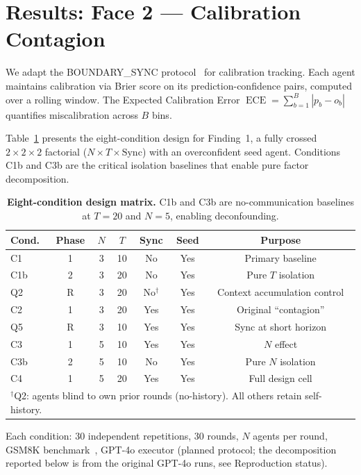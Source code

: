 \documentclass[11pt]{article}
\DeclareMathOperator{\ECE}{ECE}
\begin{document}
\section{Results: Face 2 --- Calibration Contagion}

We adapt the BOUNDARY\_SYNC protocol~\citep{boundarysync2026} for calibration tracking. Each agent maintains calibration via Brier score on its prediction-confidence pairs, computed over a rolling window. The Expected Calibration Error $\ECE = \sum_{b=1}^{B} |p_b - o_b|$ quantifies miscalibration across $B$ bins.

Table~\ref{tab:design} presents the eight-condition design for Finding~1, a fully crossed $2 \times 2 \times 2$ factorial ($N \times T \times \text{Sync}$) with an overconfident seed agent. Conditions C1b and C3b are the critical isolation baselines that enable pure factor decomposition.

\begin{table}[H]
\centering
\caption{\textbf{Eight-condition design matrix.} C1b and C3b are no-communication baselines at $T{=}20$ and $N{=}5$, enabling deconfounding.}
\label{tab:design}
\begin{tabular}{@{}lcccccc@{}}
\toprule
Cond. & Phase & $N$ & $T$ & Sync & Seed & Purpose \\
\midrule
C1  & 1 & 3 & 10 & No  & Yes & Primary baseline \\
C1b & 2 & 3 & 20 & No  & Yes & Pure $T$ isolation \\
Q2  & R & 3 & 20 & No$^\dagger$ & Yes & Context accumulation control \\
C2  & 1 & 3 & 20 & Yes & Yes & Original ``contagion'' \\
Q5  & R & 3 & 10 & Yes & Yes & Sync at short horizon \\
C3  & 1 & 5 & 10 & Yes & Yes & $N$ effect \\
C3b & 2 & 5 & 10 & No  & Yes & Pure $N$ isolation \\
C4  & 1 & 5 & 20 & Yes & Yes & Full design cell \\
\bottomrule
\multicolumn{7}{l}{\footnotesize $^\dagger$Q2: agents blind to own prior rounds (no-history). All others retain self-history.} \\
\end{tabular}
\end{table}

Each condition: 30 independent repetitions, 30 rounds, $N$ agents per round, GSM8K benchmark~\citep{cobbe2021gsm8k}, GPT-4o executor (planned protocol; the decomposition reported below is from the original GPT-4o runs, see Reproduction status).
\end{document}
